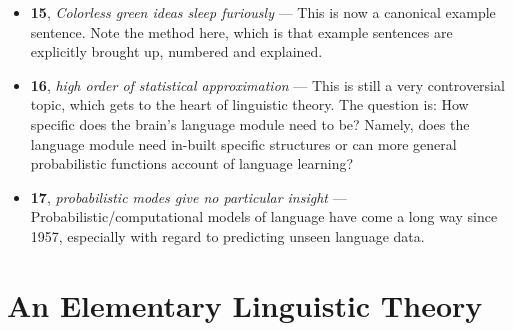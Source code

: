 \documentclass[12pt]{article}
\begin{document}
\begin{itemize}
\item \textbf{15}, \textit{Colorless green ideas sleep furiously} --- This is now a canonical example sentence. Note the method here, which is that example sentences are explicitly brought up, numbered and explained.

\item \textbf{16}, \textit{high order of statistical approximation} --- This is still a very controversial topic, which gets to the heart of linguistic theory. The question is: How specific does the brain's language module need to be? Namely, does the language module need in-built specific structures or can more general probabilistic functions account of language learning?

\item \textbf{17}, \textit{probabilistic modes give no particular insight} --- Probabilistic/computational models of language have come a long way since 1957, especially with regard to predicting unseen language data.

\end{itemize}

\section{An Elementary Linguistic Theory}
\end{document}
